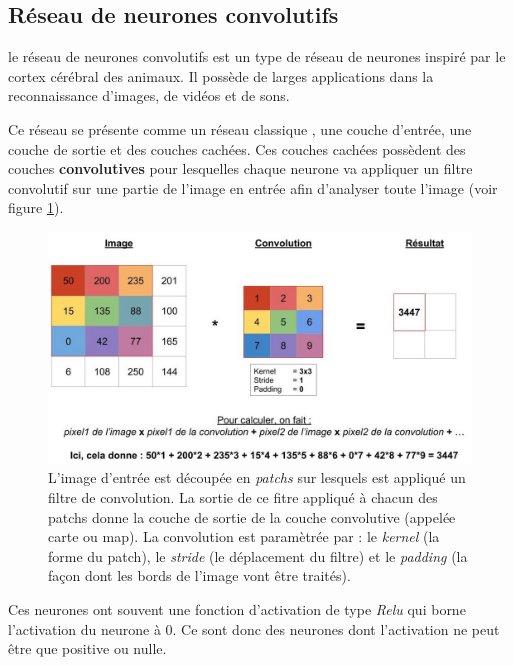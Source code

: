 \hypertarget{Ruxe9seau-de-neurones-convolutif}{%
\subsection{Réseau de neurones convolutifs}
\label{Ruxe9seau-de-neurones-convolutif}}

le réseau de neurones convolutifs est un type de réseau de neurones
inspiré par le cortex cérébral des animaux.
Il possède de larges applications dans la reconnaissance d'images, de vidéos et de sons.

Ce réseau se présente comme un réseau classique , une couche d'entrée,
une couche de sortie et des couches cachées.
Ces couches cachées possèdent des couches \textbf{convolutives}
pour lesquelles chaque neurone va appliquer un filtre convolutif
sur une partie de l'image en entrée afin d'analyser toute l'image
(voir figure \ref{fig:explication_convolution}).

\begin{figure}[h!]
\begin{center}
\centering
\includegraphics[width=15cm]{./images/explication_convolution.jpg}
\caption[Schéma de la convolution.]{L'image d'entrée est découpée en \textit{patchs}
sur lesquels est appliqué un filtre de convolution.
La sortie de ce fitre appliqué à chacun des patchs donne la couche de sortie
de la couche convolutive (appelée carte ou map).
La convolution est paramètrée par : le \textit{kernel} (la forme du patch),
le \textit{stride} (le déplacement du filtre) et le \textit{padding}
 (la façon dont les bords de l'image vont être traités).\label{fig:explication_convolution}}
\end{center}
\end{figure}

Ces neurones ont souvent une fonction d'activation de type \textit{Relu}
qui borne l'activation du neurone à 0. Ce sont donc des neurones
dont l'activation ne peut être que positive ou nulle.

